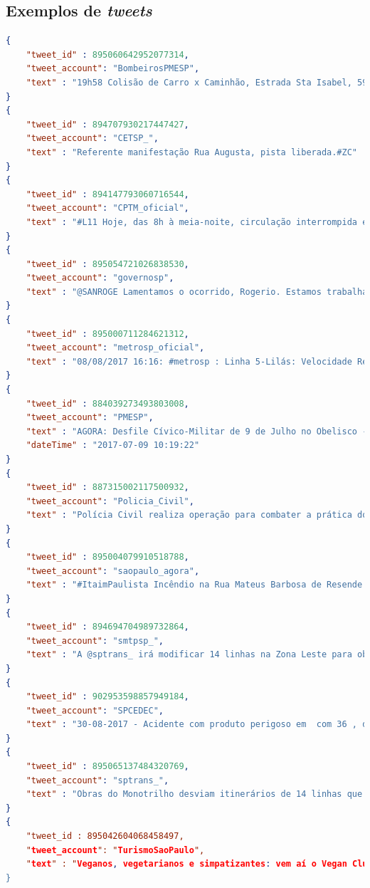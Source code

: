 \documentclass[
	12pt,				%
	oneside,			%
	a4paper,			%
	english,			%
	brazil				%
	]{abntex2ppgsi}
\begin{document}
{{%
\begin{apendicesenv}

\partapendices
\chapter{Exemplos de \textit{tweets}}
\label{apendiceA}

\begin{lstlisting}[language=json,title=Exemplos de \textit{tweets} dos \textit{profiles} selecionados citados na tabela \ref{tab:oficialProfiles}, label=tweetsSample]
{
    "tweet_id" : 895060642952077314,
    "tweet_account": "BombeirosPMESP",
    "text" : "19h58 Colisão de Carro x Caminhão, Estrada Sta Isabel, 5950 Itaquaquecetuba. 2 Vítimas, 1 Vtr. Aguardando maiores informes"
}
{
    "tweet_id" : 894707930217447427,
    "tweet_account": "CETSP_",
    "text" : "Referente manifestação Rua Augusta, pista liberada.#ZC"
}
{
    "tweet_id" : 894147793060716544,
    "tweet_account": "CPTM_oficial",
    "text" : "#L11 Hoje, das 8h à meia-noite, circulação interrompida entre Luz e Brás. P/ seguir viagem, use a L7-Rubi q prestará serviço até a Est. Brás"
}
{
    "tweet_id" : 895054721026838530,
    "tweet_account": "governosp",
    "text" : "@SANROGE Lamentamos o ocorrido, Rogerio. Estamos trabalhando continuamente para melhorar a segurança na região. Entre maio e junho, [+] [1]"
}
{
    "tweet_id" : 895000711284621312,
    "tweet_account": "metrosp_oficial",
    "text" : "08/08/2017 16:16: #metrosp : Linha 5-Lilás: Velocidade Reduzida. Mais informações em https://t.co/CaeqD26iJR"
}
{
    "tweet_id" : 884039273493803008,
    "tweet_account": "PMESP",
    "text" : "AGORA: Desfile Cívico-Militar de 9 de Julho no Obelisco - Ibirapuera SP, transmissão ao vivo na página oficial Facebook da Polícia Militar.",
    "dateTime" : "2017-07-09 10:19:22"
}
{
    "tweet_id" : 887315002117500932,
    "tweet_account": "Policia_Civil",
    "text" : "Polícia Civil realiza operação para combater a prática do Jogo conhecido como "Baleia Azul"... https://t.co/kh2HW6UZvT",
}
{
    "tweet_id" : 895004079910518788,
    "tweet_account": "saopaulo_agora",
    "text" : "#ItaimPaulista Incêndio na Rua Mateus Barbosa de Resende nº 235. Defesa Civil Regional acionada para o local. (CCOI) #spagora"
}
{
    "tweet_id" : 894694704989732864,
    "tweet_account": "smtpsp_",
    "text" : "A @sptrans_ irá modificar 14 linhas na Zona Leste para obras no Monotrilho Saiba mais: https://t.co/fCA0T7WCSY"
}
{
    "tweet_id" : 902953598857949184,
    "tweet_account": "SPCEDEC",
    "text" : "30-08-2017 - Acidente com produto perigoso em  com 36 , deixa 21 vítimas feridas e 02 ."
}
{
    "tweet_id" : 895065137484320769,
    "tweet_account": "sptrans_",
    "text" : "Obras do Monotrilho desviam itinerários de 14 linhas que atendem a Av. Sapopemba entre 5 e 11/08, das 23h às 5h: https://t.co/jH4LFgrSKZ"
}
{
    "tweet_id : 895042604068458497,
    "tweet_account": "TurismoSaoPaulo",
    "text" : "Veganos, vegetarianos e simpatizantes: vem aí o Vegan Club, em 12/08, no Centro de SP! #crueltyfree #veganfood... https://t.co/7f7ggr4vn4"
}
\end{lstlisting}


\end{apendicesenv}}}
\end{document}
